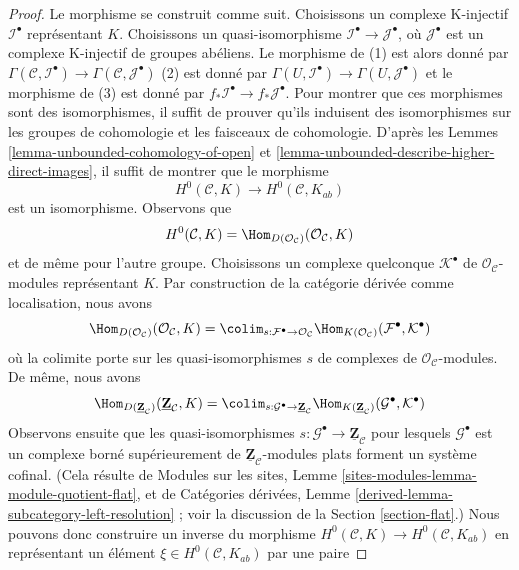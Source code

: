 \begin{proof}
Le morphisme se construit comme suit. Choisissons un complexe K-injectif
$\mathcal{I}^\bullet$ représentant $K$. Choisissons un quasi-isomorphisme
$\mathcal{I}^\bullet \to \mathcal{J}^\bullet$, où $\mathcal{J}^\bullet$
est un complexe K-injectif de groupes abéliens. Le morphisme de (1) est
alors donné par
$\Gamma(\mathcal{C}, \mathcal{I}^\bullet) \to
\Gamma(\mathcal{C}, \mathcal{J}^\bullet)$
(2) est donné par
$\Gamma(U, \mathcal{I}^\bullet) \to \Gamma(U, \mathcal{J}^\bullet)$
et le morphisme de (3) est donné par
$f_*\mathcal{I}^\bullet \to f_*\mathcal{J}^\bullet$.
Pour montrer que ces morphismes sont des isomorphismes, il suffit de
prouver qu'ils induisent des isomorphismes sur les groupes de cohomologie
et les faisceaux de cohomologie. D'après les Lemmes
\ref{lemma-unbounded-cohomology-of-open} et
\ref{lemma-unbounded-describe-higher-direct-images}, il suffit de montrer
que le morphisme
$$
H^0(\mathcal{C}, K) \longrightarrow H^0(\mathcal{C}, K_{ab})
$$
est un isomorphisme. Observons que
$$
H^0(\mathcal{C}, K) =
\Hom_{D(\mathcal{O}_\mathcal{C})}(\mathcal{O}_\mathcal{C}, K)
$$
et de même pour l'autre groupe. Choisissons un complexe quelconque
$\mathcal{K}^\bullet$ de $\mathcal{O}_\mathcal{C}$-modules représentant
$K$. Par construction de la catégorie dérivée comme localisation, nous
avons
$$
\Hom_{D(\mathcal{O}_\mathcal{C})}(\mathcal{O}_\mathcal{C}, K) =
\colim_{s : \mathcal{F}^\bullet \to \mathcal{O}_\mathcal{C}}
\Hom_{K(\mathcal{O}_\mathcal{C})}(\mathcal{F}^\bullet, \mathcal{K}^\bullet)
$$
où la colimite porte sur les quasi-isomorphismes $s$ de complexes de
$\mathcal{O}_\mathcal{C}$-modules. De même, nous avons
$$
\Hom_{D(\underline{\mathbf{Z}}_\mathcal{C})}
(\underline{\mathbf{Z}}_\mathcal{C}, K) =
\colim_{s : \mathcal{G}^\bullet \to \underline{\mathbf{Z}}_\mathcal{C}}
\Hom_{K(\underline{\mathbf{Z}}_\mathcal{C})}
(\mathcal{G}^\bullet, \mathcal{K}^\bullet)
$$
Observons ensuite que les quasi-isomorphismes
$s : \mathcal{G}^\bullet \to \underline{\mathbf{Z}}_\mathcal{C}$
pour lesquels $\mathcal{G}^\bullet$ est un complexe borné supérieurement
de $\underline{\mathbf{Z}}_\mathcal{C}$-modules plats forment un système
cofinal. (Cela résulte de Modules sur les sites, Lemme
\ref{sites-modules-lemma-module-quotient-flat}, et de Catégories dérivées,
Lemme \ref{derived-lemma-subcategory-left-resolution} ; voir la discussion
de la Section \ref{section-flat}.) Nous pouvons donc construire un inverse
du morphisme
$H^0(\mathcal{C}, K) \longrightarrow H^0(\mathcal{C}, K_{ab})$
en représentant un élément $\xi \in H^0(\mathcal{C}, K_{ab})$ par une paire

\end{proof}
